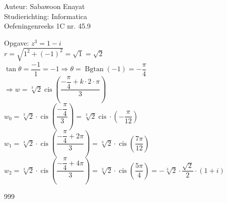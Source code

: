 \documentclass[a4paper]{article}
\begin{document}
  
\noindent \large Auteur: Sabawoon Enayat \\
\noindent \large Studierichting: Informatica\\
\noindent \large Oefeningenreeks 1C nr. 45.9\\

\newcommand{\Bgtan}{\operatorname{Bgtan}}
\newcommand{\cis}{\operatorname{cis}}

\medskip

\normalsize

Opgave: $z^3 = 1 - i$\\

$r = \sqrt{1^2 + (-1)^2} = \sqrt{1} = \sqrt{2}$\\

$\tan \theta = \dfrac{-1}{1} = -1 \Rightarrow \theta = \Bgtan (-1) = -\dfrac{\pi}{4}$\\

$\Rightarrow w = \sqrt[3]{2} \cis \left(\dfrac{-\dfrac{\pi}{4} + k \cdot 2 \cdot \pi}{3}\right)$\\

$w_0 = \sqrt[3]{2} \cdot \cis \left(\dfrac{-\dfrac{\pi}{4}}{3}\right) = \sqrt[3]{2}\cis \cdot \left(-\dfrac{\pi}{12}\right)$\\

$w_1 = \sqrt[3]{2} \cdot \cis \left(\dfrac{-\dfrac{\pi}{4} + 2\pi}{3}\right) = \sqrt[3]{2} \cdot \cis \left(\dfrac{7\pi}{12}\right)$\\

$w_2 = \sqrt[3]{2} \cdot \cis \left(\dfrac{-\dfrac{\pi}{4} + 4\pi}{3}\right) = \sqrt[3]{2} \cdot \cis \left(\dfrac{5\pi}{4}\right) = -\sqrt[3]{2} \cdot \dfrac{\sqrt{2}}{2} \cdot \left(1 + i\right)$\\

\begin{thebibliography}{999}
\end{thebibliography}
\end{document}

